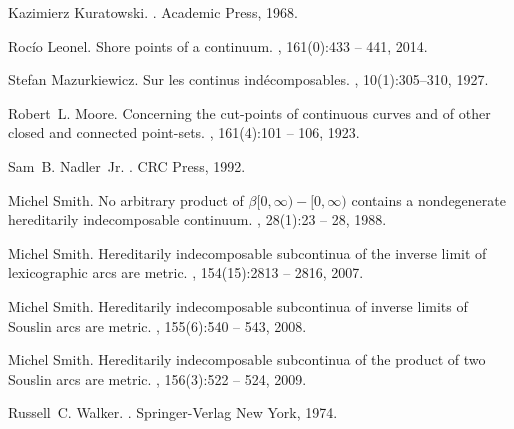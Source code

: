 \documentclass[12pt]{article}
\theoremstyle{plain}
\theoremstyle{definition}
\newcommand{\0}{\ensuremath{\varnothing}}
\begin{document}
\begin{thebibliography}{10}
	Kazimierz Kuratowski.
	.
	\newblock Academic Press, 1968.
	
	Roc{\'i}o Leonel.
	\newblock Shore points of a continuum.
	, 161(0):433 -- 441, 2014.
	
	Stefan Mazurkiewicz.
	\newblock Sur les continus ind\'ecomposables.
	, 10(1):305--310, 1927.
	
	Robert~L. Moore.
	\newblock Concerning the cut-points of continuous curves and of other closed
	and connected point-sets.
	, 161(4):101 -- 106, 1923.
	
	Sam~B. Nadler~Jr.
	.
	\newblock CRC Press, 1992.
	
	Michel Smith.
	\newblock No arbitrary product of {$\beta[0, \infty) - [0, \infty)$} contains a
	nondegenerate hereditarily indecomposable continuum.
	, 28(1):23 -- 28, 1988.
	
	Michel Smith.
	\newblock Hereditarily indecomposable subcontinua of the inverse limit of
	lexicographic arcs are metric.
	, 154(15):2813 -- 2816, 2007.
	
	Michel Smith.
	\newblock Hereditarily indecomposable subcontinua of inverse limits of
	{S}ouslin arcs are metric.
	, 155(6):540 -- 543, 2008.
	
	Michel Smith.
	\newblock Hereditarily indecomposable subcontinua of the product of two
	{S}ouslin arcs are metric.
	, 156(3):522 -- 524, 2009.
	
	Russell~C. Walker.
	.
	\newblock Springer-Verlag New York, 1974.
	
\end{thebibliography}

	 
\end{document}
